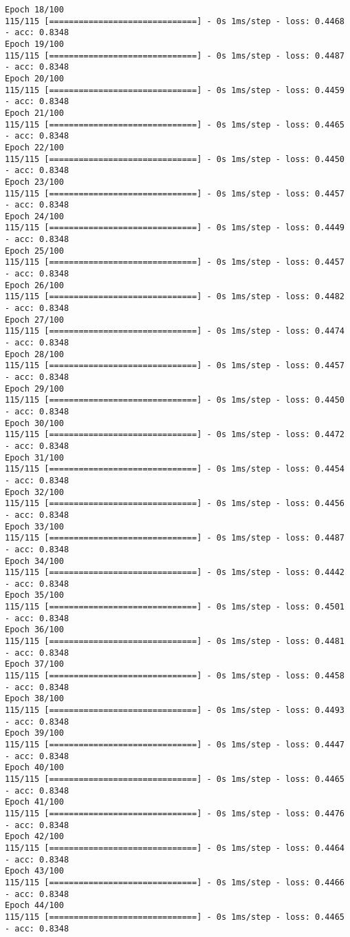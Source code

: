 \documentclass[11pt]{article}
\begin{document}
\begin{Verbatim}[commandchars=\\\{\}]
Epoch 18/100
115/115 [==============================] - 0s 1ms/step - loss: 0.4468 - acc: 0.8348
Epoch 19/100
115/115 [==============================] - 0s 1ms/step - loss: 0.4487 - acc: 0.8348
Epoch 20/100
115/115 [==============================] - 0s 1ms/step - loss: 0.4459 - acc: 0.8348
Epoch 21/100
115/115 [==============================] - 0s 1ms/step - loss: 0.4465 - acc: 0.8348
Epoch 22/100
115/115 [==============================] - 0s 1ms/step - loss: 0.4450 - acc: 0.8348
Epoch 23/100
115/115 [==============================] - 0s 1ms/step - loss: 0.4457 - acc: 0.8348
Epoch 24/100
115/115 [==============================] - 0s 1ms/step - loss: 0.4449 - acc: 0.8348
Epoch 25/100
115/115 [==============================] - 0s 1ms/step - loss: 0.4457 - acc: 0.8348
Epoch 26/100
115/115 [==============================] - 0s 1ms/step - loss: 0.4482 - acc: 0.8348
Epoch 27/100
115/115 [==============================] - 0s 1ms/step - loss: 0.4474 - acc: 0.8348
Epoch 28/100
115/115 [==============================] - 0s 1ms/step - loss: 0.4457 - acc: 0.8348
Epoch 29/100
115/115 [==============================] - 0s 1ms/step - loss: 0.4450 - acc: 0.8348
Epoch 30/100
115/115 [==============================] - 0s 1ms/step - loss: 0.4472 - acc: 0.8348
Epoch 31/100
115/115 [==============================] - 0s 1ms/step - loss: 0.4454 - acc: 0.8348
Epoch 32/100
115/115 [==============================] - 0s 1ms/step - loss: 0.4456 - acc: 0.8348
Epoch 33/100
115/115 [==============================] - 0s 1ms/step - loss: 0.4487 - acc: 0.8348
Epoch 34/100
115/115 [==============================] - 0s 1ms/step - loss: 0.4442 - acc: 0.8348
Epoch 35/100
115/115 [==============================] - 0s 1ms/step - loss: 0.4501 - acc: 0.8348
Epoch 36/100
115/115 [==============================] - 0s 1ms/step - loss: 0.4481 - acc: 0.8348
Epoch 37/100
115/115 [==============================] - 0s 1ms/step - loss: 0.4458 - acc: 0.8348
Epoch 38/100
115/115 [==============================] - 0s 1ms/step - loss: 0.4493 - acc: 0.8348
Epoch 39/100
115/115 [==============================] - 0s 1ms/step - loss: 0.4447 - acc: 0.8348
Epoch 40/100
115/115 [==============================] - 0s 1ms/step - loss: 0.4465 - acc: 0.8348
Epoch 41/100
115/115 [==============================] - 0s 1ms/step - loss: 0.4476 - acc: 0.8348
Epoch 42/100
115/115 [==============================] - 0s 1ms/step - loss: 0.4464 - acc: 0.8348
Epoch 43/100
115/115 [==============================] - 0s 1ms/step - loss: 0.4466 - acc: 0.8348
Epoch 44/100
115/115 [==============================] - 0s 1ms/step - loss: 0.4465 - acc: 0.8348

\end{Verbatim}
\end{document}
